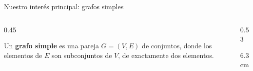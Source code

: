 \begin{frame}{Nuestro interés principal: grafos simples}
   \begin{columns}[c]
      \begin{column}{0.45\textwidth}
         \begin{Def}
            Un \textbf{grafo simple} es una pareja $G=(V,E)$ de conjuntos, donde los elementos de $E$ son subconjuntos de $V$, de exactamente dos elementos.\vspace{0.3cm}
         \end{Def}
      \end{column}
      \begin{column}{0.53\textwidth}
         \begin{overlayarea}{\linewidth}{6.3cm}
         \small
         \end{overlayarea}
      \end{column}
   \end{columns}
\end{frame}

